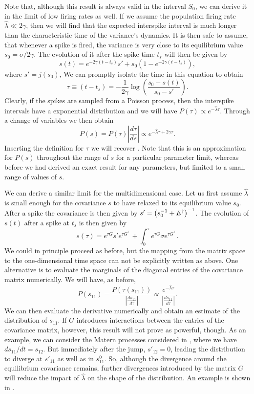 \par
Note that, although this result is always valid in the interval $S_0$, we can derive it in the limit of low firing rates as well. If we assume the population firing rate $\hat{\lambda} \ll 2\gamma$, then we will find that the expected interspike interval is much longer than the characteristic time of the variance's dynamics. It is then safe to assume, that whenever a spike is fired, the variance is very close to its equilibrium value $s_0 = \sigma/2\gamma$. The evolution of it after the spike time $t_s$ will then be given by
\[
s(t) = e^{-2\gamma(t-t_s)} s' + s_0 \left(1-e^{-2\gamma (t-t_s)}\right),
\]
where $s' = j(s_0)$,
We can promptly isolate the time in this equation to obtain
\[
\tau \equiv (t-t_s) = -\frac{1}{2\gamma} \log\left(\frac{s_0-s(t)}{s_0-s'}\right).
\]
Clearly, if the spikes are sampled from a Poisson process, then the interspike intervals have a exponential distribution and we will have $P(\tau) \propto e^{-\hat{\lambda}\tau}$. Through a change of variables we then obtain
\[
P(s) = P(\tau) \left|\frac{d\tau}{ds}\right| \propto e^{-\hat{\lambda} \tau + 2\gamma \tau}.
\]
Inserting the definition for $\tau$ we will recover . Note that this is an approximation for $P(s)$ throughout the range of $s$ for a particular parameter limit, whereas before we had derived an exact result for any parameters, but limited to a small range of values of $s$.\par
We can derive a similar limit for the multidimensional case. Let us first assume $\hat{\lambda}$ is small enough for the covariance $s$ to have relaxed to its equilibrium value $s_0$. After a spike the covariance is then given by $s' = \left(s_0^{-1}+E^\dagger\right)^{-1}$. The evolution of $s(t)$ after a spike at $t_s$ is then given by
\[
s(\tau) = e^{\tau G} s' e^{\tau G^\top} + \int_0^\tau e^{\tau G}\sigma e^{\tau G^\top}.
\]
We could in principle proceed as before, but the mapping from the matrix space to the one-dimensional time space can not be explicitly written as above. One alternative is to evaluate the marginals of the diagonal entries of the covariance matrix numerically. We will have, as before,
\[
P(s_{11}) = \frac{P(\tau(s_{11}))}{\left|\frac{d s_{11}}{d\tau}\right|} \propto \frac{e^{-\hat{\lambda} \tau}}{\left|\frac{d s_{11}}{d\tau}\right|}.
\]
We can then evaluate the derivative numerically and obtain an estimate of the distribution of $s_{11}$. If $G$ introduces interactions between the entries of the covariance matrix, however, this result will not prove as powerful, though. As an example, we can consider the Matern processes considered in \citep{Susemihl2012a}, where we have $ds_{11}/dt = s_{12}$. But immediately after the jump, $s'_{12} = 0$, leading the distribution to diverge at $s'_{11}$ as well as in $s^0_{11}$. So, although the divergence around the equilibrium covariance remains, further divergences introduced by the matrix $G$ will reduce the impact of $\hat{\lambda}$ on the shape of the distribution. An example is shown in .
